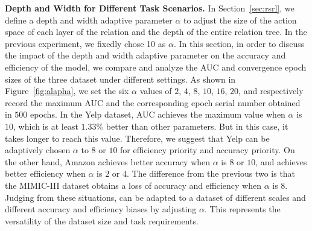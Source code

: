 \textbf{Depth and Width for Different Task Scenarios. }
In Section~\ref{sec:rsrl}, we define a depth and width adaptive parameter $\alpha$ to adjust the size of the action space of each layer of the relation and the depth of the entire relation tree. 
In the previous experiment, we fixedly chose 10 as $\alpha$.
In this section, in order to discuss the impact of the depth and width adaptive parameter on the accuracy and efficiency of the \RioGNN model, we compare and analyze the AUC and convergence epoch sizes of the three dataset under different settings.
As shown in Figure~\ref{fig:alapha}, we set the six $\alpha$ values of $2$, $4$, $8$, $10$, $16$, $20$, and respectively record the maximum AUC and the corresponding epoch serial number obtained in $500$ epochs. 
In the Yelp dataset, AUC achieves the maximum value when $\alpha$ is $10$, which is at least $1.33\%$ better than other parameters. 
But in this case, it takes longer to reach this value. 
Therefore, we suggest that Yelp can be adaptively chosen $\alpha$ to $8$ or $10$ for efficiency priority and accuracy priority.
On the other hand, Amazon achieves better accuracy when $\alpha$ is $8$ or $10$, and achieves better efficiency when $\alpha$ is $2$ or $4$. 
The difference from the previous two is that the MIMIC-III dataset obtains a loss of accuracy and efficiency when $\alpha$ is $8$.
Judging from these situations, \RioGNN can be adapted to a dataset of different scales and different accuracy and efficiency biases by adjusting $\alpha$. 
This represents the versatility of the dataset size and task requirements.



